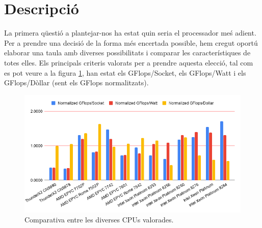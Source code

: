 \documentclass{article}
\begin{document}






\section{Descripció}

La primera qüestió a plantejar-nos ha estat quin seria el processador meś adient. Per a prendre una decisió de la forma més encertada possible, hem cregut oportú elaborar una taula amb diverses possibilitats i comparar les característiques de totes elles. Els principals criteris valorats per a prendre aquesta elecció, tal com es pot veure a la figura \ref{chartCPUs}, han estat els GFlops/Socket, els GFlops/Watt i els GFlops/Dòllar (sent els GFlops normalitzats). 

\begin{figure}[h]
    \centering
    \includegraphics[width=\textwidth]{entregable/fitxers/chartCPU}
    \caption{Comparativa entre les diverses CPUs valorades.}
    \label{chartCPUs}
\end{figure}
\end{document}
